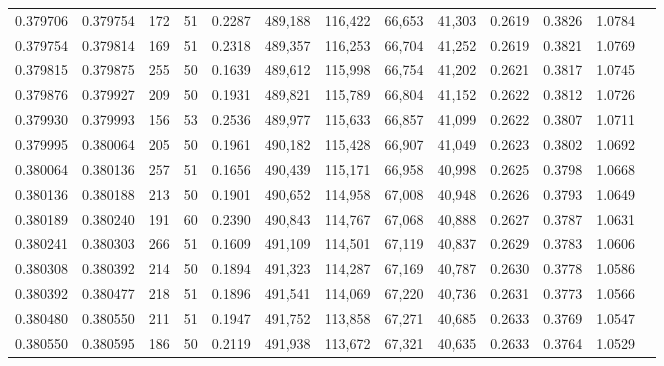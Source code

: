 \begin{tabular}{rrrrrrrrrrrrr}
0.379706 & 0.379754 &   172 &  51 &                                     0.2287 & 489,188 & 116,422 &  66,653 &  41,303 & 0.2619 & 0.3826 & 1.0784 \\
0.379754 & 0.379814 &   169 &  51 &                                     0.2318 & 489,357 & 116,253 &  66,704 &  41,252 & 0.2619 & 0.3821 & 1.0769 \\
0.379815 & 0.379875 &   255 &  50 &                                     0.1639 & 489,612 & 115,998 &  66,754 &  41,202 & 0.2621 & 0.3817 & 1.0745 \\
0.379876 & 0.379927 &   209 &  50 &                                     0.1931 & 489,821 & 115,789 &  66,804 &  41,152 & 0.2622 & 0.3812 & 1.0726 \\
0.379930 & 0.379993 &   156 &  53 &                                     0.2536 & 489,977 & 115,633 &  66,857 &  41,099 & 0.2622 & 0.3807 & 1.0711 \\
0.379995 & 0.380064 &   205 &  50 &                                     0.1961 & 490,182 & 115,428 &  66,907 &  41,049 & 0.2623 & 0.3802 & 1.0692 \\
0.380064 & 0.380136 &   257 &  51 &                                     0.1656 & 490,439 & 115,171 &  66,958 &  40,998 & 0.2625 & 0.3798 & 1.0668 \\
0.380136 & 0.380188 &   213 &  50 &                                     0.1901 & 490,652 & 114,958 &  67,008 &  40,948 & 0.2626 & 0.3793 & 1.0649 \\
0.380189 & 0.380240 &   191 &  60 &                                     0.2390 & 490,843 & 114,767 &  67,068 &  40,888 & 0.2627 & 0.3787 & 1.0631 \\
0.380241 & 0.380303 &   266 &  51 &                                     0.1609 & 491,109 & 114,501 &  67,119 &  40,837 & 0.2629 & 0.3783 & 1.0606 \\
0.380308 & 0.380392 &   214 &  50 &                                     0.1894 & 491,323 & 114,287 &  67,169 &  40,787 & 0.2630 & 0.3778 & 1.0586 \\
0.380392 & 0.380477 &   218 &  51 &                                     0.1896 & 491,541 & 114,069 &  67,220 &  40,736 & 0.2631 & 0.3773 & 1.0566 \\
0.380480 & 0.380550 &   211 &  51 &                                     0.1947 & 491,752 & 113,858 &  67,271 &  40,685 & 0.2633 & 0.3769 & 1.0547 \\
0.380550 & 0.380595 &   186 &  50 &                                     0.2119 & 491,938 & 113,672 &  67,321 &  40,635 & 0.2633 & 0.3764 & 1.0529 \\

\end{tabular}
